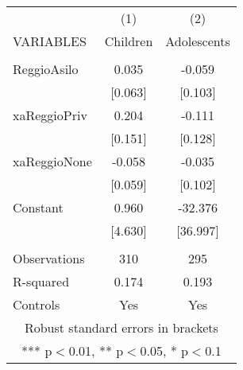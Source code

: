\begin{tabular}{lcc} \hline
 & (1) & (2) \\
VARIABLES & Children & Adolescents \\ \hline
 &  &  \\
ReggioAsilo & 0.035 & -0.059 \\
 & [0.063] & [0.103] \\
xaReggioPriv & 0.204 & -0.111 \\
 & [0.151] & [0.128] \\
xaReggioNone & -0.058 & -0.035 \\
 & [0.059] & [0.102] \\
Constant & 0.960 & -32.376 \\
 & [4.630] & [36.997] \\
 &  &  \\
Observations & 310 & 295 \\
R-squared & 0.174 & 0.193 \\
 Controls & Yes & Yes \\ \hline
\multicolumn{3}{c}{ Robust standard errors in brackets} \\
\multicolumn{3}{c}{ *** p$<$0.01, ** p$<$0.05, * p$<$0.1} \\
\end{tabular}
